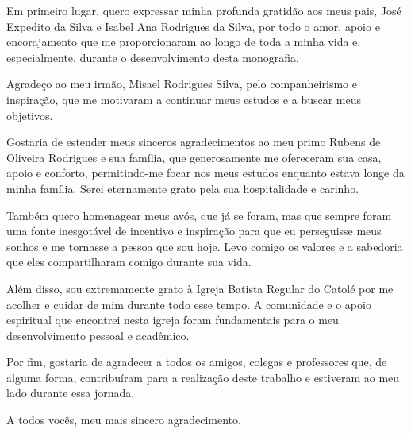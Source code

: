 Em primeiro lugar, quero expressar minha profunda gratidão aos meus pais, José Expedito da Silva e 
Isabel Ana Rodrigues da Silva, por todo o amor, apoio e encorajamento que me proporcionaram ao longo 
de toda a minha vida e, especialmente, durante o desenvolvimento desta monografia.

Agradeço ao meu irmão, Misael Rodrigues Silva, pelo companheirismo e inspiração, que me motivaram a 
continuar meus estudos e a buscar meus objetivos.

Gostaria de estender meus sinceros agradecimentos ao meu primo Rubens de Oliveira Rodrigues e sua 
família, que generosamente me ofereceram sua casa, apoio e conforto, permitindo-me focar nos meus 
estudos enquanto estava longe da minha família. Serei eternamente grato pela sua hospitalidade e 
carinho.

Também quero homenagear meus avós, que já se foram, mas que sempre foram uma fonte inesgotável de 
incentivo e inspiração para que eu perseguisse meus sonhos e me tornasse a pessoa que sou hoje. Levo 
comigo os valores e a sabedoria que eles compartilharam comigo durante sua vida.

Além disso, sou extremamente grato à Igreja Batista Regular do Catolé por me acolher e cuidar de mim 
durante todo esse tempo. A comunidade e o apoio espiritual que encontrei nesta igreja foram 
fundamentais para o meu desenvolvimento pessoal e acadêmico.

Por fim, gostaria de agradecer a todos os amigos, colegas e professores que, de alguma forma, 
contribuíram para a realização deste trabalho e estiveram ao meu lado durante essa jornada.

A todos vocês, meu mais sincero agradecimento.